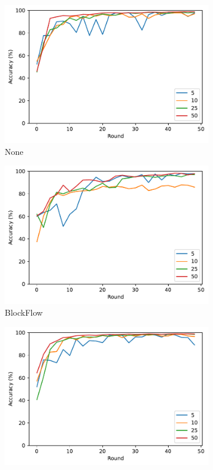 \begin{figure}[!ht]
    \centering
    \begin{subfigure}[b]{0.49\textwidth}
        \centering
        \includegraphics[width=\textwidth]{graphics/clients/accuracy_none.pdf}
        \caption{None}
    \end{subfigure}
    \hfill
    \begin{subfigure}[b]{0.49\textwidth}
        \centering
        \includegraphics[width=\textwidth]{graphics/clients/accuracy_blockflow.pdf}
        \caption{BlockFlow}
    \end{subfigure}
    \hfill
    \begin{subfigure}[b]{0.49\textwidth}
        \centering
        \includegraphics[width=\textwidth]{graphics/clients/accuracy_marginalgain.pdf}

\end{subfigure}
\end{figure}

